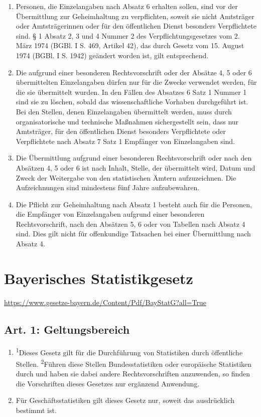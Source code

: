 \documentclass[A4, 12pt]{scrbook}
\begin{document}
\begin{enumerate}[label=(\arabic*)]
\begin{enumerate}[label=\arabic*.]
                \end{enumerate}
            \item Personen, die Einzelangaben nach Absatz 6 erhalten sollen, sind vor der Übermittlung zur Geheimhaltung zu verpflichten, soweit sie nicht Amtsträger oder Amtsträgerinnen oder für den öffentlichen Dienst besonders Verpflichtete sind. § 1 Absatz 2, 3 und 4 Nummer 2 des Verpflichtungsgesetzes vom 2. März 1974 (BGBl. I S. 469, Artikel 42), das durch Gesetz vom 15. August 1974 (BGBl. I S. 1942) geändert worden ist, gilt entsprechend. 
            \item Die aufgrund einer besonderen Rechtsvorschrift oder der Absätze 4, 5 oder 6 übermittelten Einzelangaben dürfen nur für die Zwecke verwendet werden, für die sie übermittelt wurden. In den Fällen des Absatzes 6 Satz 1 Nummer 1 sind sie zu löschen, sobald das wissenschaftliche Vorhaben durchgeführt ist. Bei den Stellen, denen Einzelangaben übermittelt werden, muss durch organisatorische und technische Maßnahmen sichergestellt sein, dass nur Amtsträger, für den öffentlichen Dienst besonders Verpflichtete oder Verpflichtete nach Absatz 7 Satz 1 Empfänger von Einzelangaben sind.
            \item Die Übermittlung aufgrund einer besonderen Rechtsvorschrift oder nach den Absätzen 4, 5 oder 6 ist nach Inhalt, Stelle, der übermittelt wird, Datum und Zweck der Weitergabe von den statistischen Ämtern aufzuzeichnen. Die Aufzeichnungen sind mindestens fünf Jahre aufzubewahren.
            \item Die Pflicht zur Geheimhaltung nach Absatz 1 besteht auch für die Personen, die Empfänger von Einzelangaben aufgrund einer besonderen Rechtsvorschrift, nach den Absätzen 5, 6 oder von Tabellen nach Absatz 4 sind. Dies gilt nicht für offenkundige Tatsachen bei einer Übermittlung nach Absatz 4.
        \end{enumerate}
\chapter[BayStatG]{Bayerisches Statistikgesetz}
\newline
\url{https://www.gesetze-bayern.de/Content/Pdf/BayStatG?all=True}
    \section{Art. 1: Geltungsbereich}
        \begin{enumerate}[label=(\arabic*)]
            \item \textsuperscript{1}Dieses Gesetz gilt für die Durchführung von Statistiken durch öffentliche Stellen. \textsuperscript{2}Führen diese Stellen Bundesstatistiken oder europäische Statistiken durch und haben sie dabei andere Rechtsvorschriften anzuwenden, so finden die Vorschriften dieses Gesetzes nur ergänzend Anwendung.
            \item Für Geschäftsstatistiken gilt dieses Gesetz nur, soweit das ausdrücklich bestimmt ist.
        \end{enumerate}
\end{document}
